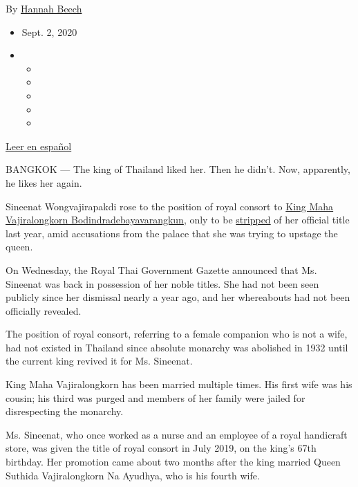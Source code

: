 By \href{https://www.nytimes3xbfgragh.onion/by/hannah-beech}{Hannah
Beech}

\begin{itemize}
\item
  Sept. 2, 2020
\item
  \begin{itemize}
  \item
  \item
  \item
  \item
  \item
  \end{itemize}
\end{itemize}

\href{https://www.nytimes3xbfgragh.onion/es/2020/09/02/espanol/mundo/consorte-real-tailandia.html}{Leer
en español}

BANGKOK --- The king of Thailand liked her. Then he didn't. Now,
apparently, he likes her again.

Sineenat Wongvajirapakdi rose to the position of royal consort to
\href{https://www.nytimes3xbfgragh.onion/2016/12/01/world/asia/thailand-king.html?module=inline}{King
Maha Vajiralongkorn Bodindradebayavarangkun}, only to be
\href{https://www.nytimes3xbfgragh.onion/2019/10/21/world/asia/king-thailand-royal-consort.html?searchResultPosition=1}{stripped}
of her official title last year, amid accusations from the palace that
she was trying to upstage the queen.

On Wednesday, the Royal Thai Government Gazette announced that Ms.
Sineenat was back in possession of her noble titles. She had not been
seen publicly since her dismissal nearly a year ago, and her whereabouts
had not been officially revealed.

The position of royal consort, referring to a female companion who is
not a wife, had not existed in Thailand since absolute monarchy was
abolished in 1932 until the current king revived it for Ms. Sineenat.

King Maha Vajiralongkorn has been married multiple times. His first wife
was his cousin; his third was purged and members of her family were
jailed for disrespecting the monarchy.

Ms. Sineenat, who once worked as a nurse and an employee of a royal
handicraft store, was given the title of royal consort in July 2019, on
the king's 67th birthday. Her promotion came about two months after the
king married Queen Suthida Vajiralongkorn Na Ayudhya, who is his fourth
wife.

